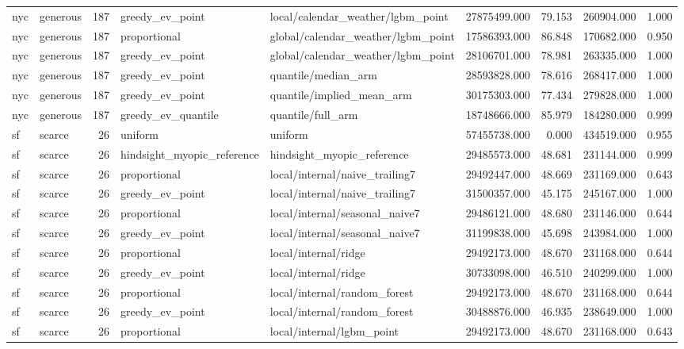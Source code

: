 \begin{tabular}{llrllrrrr}
nyc & generous & 187 & greedy\_ev\_point & local/calendar\_weather/lgbm\_point & 27875499.000 & 79.153 & 260904.000 & 1.000 \\
nyc & generous & 187 & proportional & global/calendar\_weather/lgbm\_point & 17586393.000 & 86.848 & 170682.000 & 0.950 \\
nyc & generous & 187 & greedy\_ev\_point & global/calendar\_weather/lgbm\_point & 28106701.000 & 78.981 & 263335.000 & 1.000 \\
nyc & generous & 187 & greedy\_ev\_point & quantile/median\_arm & 28593828.000 & 78.616 & 268417.000 & 1.000 \\
nyc & generous & 187 & greedy\_ev\_point & quantile/implied\_mean\_arm & 30175303.000 & 77.434 & 279828.000 & 1.000 \\
nyc & generous & 187 & greedy\_ev\_quantile & quantile/full\_arm & 18748666.000 & 85.979 & 184280.000 & 0.999 \\
sf & scarce & 26 & uniform & uniform & 57455738.000 & 0.000 & 434519.000 & 0.955 \\
sf & scarce & 26 & hindsight\_myopic\_reference & hindsight\_myopic\_reference & 29485573.000 & 48.681 & 231144.000 & 0.999 \\
sf & scarce & 26 & proportional & local/internal/naive\_trailing7 & 29492447.000 & 48.669 & 231169.000 & 0.643 \\
sf & scarce & 26 & greedy\_ev\_point & local/internal/naive\_trailing7 & 31500357.000 & 45.175 & 245167.000 & 1.000 \\
sf & scarce & 26 & proportional & local/internal/seasonal\_naive7 & 29486121.000 & 48.680 & 231146.000 & 0.644 \\
sf & scarce & 26 & greedy\_ev\_point & local/internal/seasonal\_naive7 & 31199838.000 & 45.698 & 243984.000 & 1.000 \\
sf & scarce & 26 & proportional & local/internal/ridge & 29492173.000 & 48.670 & 231168.000 & 0.644 \\
sf & scarce & 26 & greedy\_ev\_point & local/internal/ridge & 30733098.000 & 46.510 & 240299.000 & 1.000 \\
sf & scarce & 26 & proportional & local/internal/random\_forest & 29492173.000 & 48.670 & 231168.000 & 0.644 \\
sf & scarce & 26 & greedy\_ev\_point & local/internal/random\_forest & 30488876.000 & 46.935 & 238649.000 & 1.000 \\
sf & scarce & 26 & proportional & local/internal/lgbm\_point & 29492173.000 & 48.670 & 231168.000 & 0.643 \\

\end{tabular}
